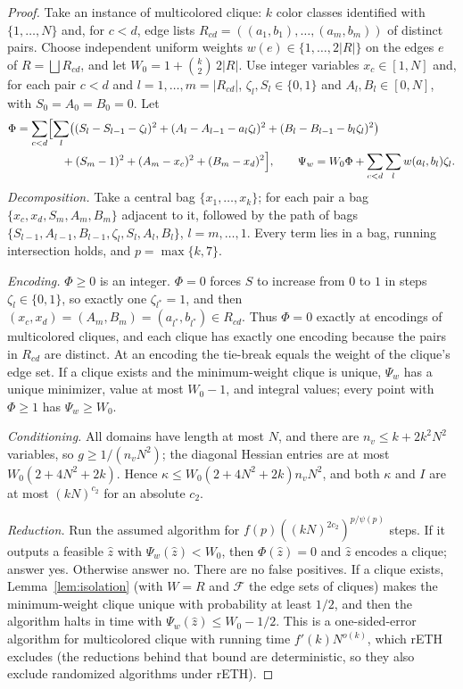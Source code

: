 \begin{proof}
Take an instance of multicolored clique: $k$ color classes identified with
$\{1,\dots,N\}$ and, for $c<d$, edge lists
$R_{cd}=((a_1,b_1),\dots,(a_m,b_m))$ of distinct pairs. Choose independent
uniform weights $w(e)\in\{1,\dots,2|R|\}$ on the edges $e$ of
$R=\bigsqcup R_{cd}$, and let $W_0=1+\binom k2\,2|R|$. Use integer variables
$x_c\in[1,N]$ and, for each pair $c<d$ and $l=1,\dots,m=|R_{cd}|$,
$\zeta_l,S_l\in\{0,1\}$ and $A_l,B_l\in[0,N]$, with $S_0=A_0=B_0=0$. Let
\begin{align*}
\Phi&=\sum_{c<d}\Bigl[\sum_{l}\bigl((S_l-S_{l-1}-\zeta_l)^2
+(A_l-A_{l-1}-a_l\zeta_l)^2+(B_l-B_{l-1}-b_l\zeta_l)^2\bigr)\\
&\qquad\qquad+(S_m-1)^2+(A_m-x_c)^2+(B_m-x_d)^2\Bigr],\qquad
\Psi_w=W_0\Phi+\sum_{c<d}\sum_lw(a_l,b_l)\zeta_l .
\end{align*}
\emph{Decomposition.} Take a central bag $\{x_1,\dots,x_k\}$; for each pair a
bag $\{x_c,x_d,S_m,A_m,B_m\}$ adjacent to it, followed by the path of bags
$\{S_{l-1},A_{l-1},B_{l-1},\zeta_l,S_l,A_l,B_l\}$, $l=m,\dots,1$. Every term
lies in a bag, running intersection holds, and $p=\max\{k,7\}$.

\emph{Encoding.} $\Phi\ge0$ is an integer. $\Phi=0$ forces $S$ to increase
from $0$ to $1$ in steps $\zeta_l\in\{0,1\}$, so exactly one $\zeta_{l^*}=1$,
and then $(x_c,x_d)=(A_m,B_m)=(a_{l^*},b_{l^*})\in R_{cd}$. Thus $\Phi=0$
exactly at encodings of multicolored cliques, and each clique has exactly one
encoding because the pairs in $R_{cd}$ are distinct. At an encoding the
tie-break equals the weight of the clique's edge set. If a clique exists and
the minimum-weight clique is unique, $\Psi_w$ has a unique minimizer, value at
most $W_0-1$, and integral values; every point with $\Phi\ge1$ has
$\Psi_w\ge W_0$.

\emph{Conditioning.} All domains have length at most $N$, and there are
$n_v\le k+2k^2N^2$ variables, so $g\ge1/(n_vN^2)$; the diagonal Hessian entries
are at most $W_0(2+4N^2+2k)$. Hence $\kappa\le W_0(2+4N^2+2k)n_vN^2$, and both
$\kappa$ and $I$ are at most $(kN)^{c_2}$ for an absolute $c_2$.

\emph{Reduction.} Run the assumed algorithm for
$f(p)((kN)^{2c_2})^{p/\psi(p)}$ steps. If it outputs a feasible $\hat z$ with
$\Psi_w(\hat z)<W_0$, then $\Phi(\hat z)=0$ and $\hat z$ encodes a clique; answer
yes. Otherwise answer no. There are no false positives. If a clique exists,
Lemma~\ref{lem:isolation} (with $W=R$ and $\mathcal F$ the edge sets of
cliques) makes the minimum-weight clique unique with probability at least
$1/2$, and then the algorithm halts in time with $\Psi_w(\hat z)\le W_0-1/2$.
This is a one-sided-error algorithm for multicolored clique with running time
$f'(k)N^{o(k)}$, which rETH excludes \cite{ChenEtAl2006} (the reductions
behind that bound are deterministic, so they also exclude randomized
algorithms under rETH).
\end{proof}

